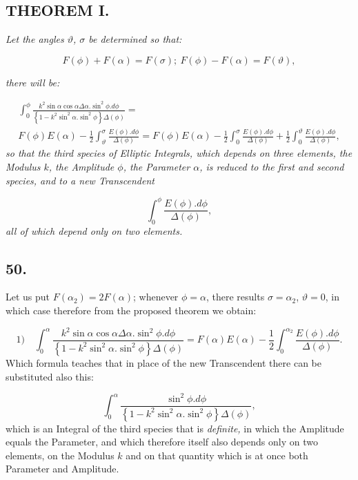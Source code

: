 \documentclass{article}
\begin{document}
\subsection*{THEOREM I.}

\emph{Let the angles $\vartheta$, $\sigma$ be determined so that:}

\[
F(\phi)+F(\alpha)=F(\sigma);\ F(\phi)-F(\alpha)=F(\vartheta),
\]

\emph{there will be:}

\[
\begin{gathered}
\int_{0}^{\phi}\frac{k^{2}\sin\alpha\cos\alpha\Delta\alpha.\sin^{2}\phi.d\phi}{\left\{1-k^{2}\sin^{2}\alpha.\sin^{2}\phi\right\}\Delta(\phi)}=\\[1.5ex]
F(\phi)E(\alpha)-\frac{1}{2}\int_{\vartheta}^{\sigma}\frac{E(\phi).d\phi}{\Delta(\phi)}=F(\phi)E(\alpha)-\frac{1}{2}\int_{0}^{\sigma}\frac{E(\phi).d\phi}{\Delta(\phi)}+\frac{1}{2}\int_{0}^{\vartheta}\frac{E(\phi).d\phi}{\Delta(\phi)},
\end{gathered}
\]
\emph{so that the third species of Elliptic Integrals, which depends on three elements, the Modulus $k$, the Amplitude $\phi$, the Parameter $\alpha$, is reduced to the first and second species, and to a new Transcendent}

\[
\int_{0}^{\phi}\frac{E(\phi).d\phi}{\Delta(\phi)},
\]
\emph{all of which depend only on two elements.}

\subsection*{50.}

Let us put $F(\alpha_{2})=2F(\alpha)$; whenever $\phi=\alpha$, there results $\sigma=\alpha_{2}$, $\vartheta=0$, in which case therefore from the proposed theorem we obtain:

\[
\text{1)}\quad\int_{0}^{\alpha}\frac{k^{2}\sin\alpha\cos\alpha\Delta\alpha.\sin^{2}\phi.d\phi}{\left\{1-k^{2}\sin^{2}\alpha.\sin^{2}\phi\right\}\Delta(\phi)}=F(\alpha)E(\alpha)-\frac{1}{2}\int_{0}^{\alpha_{2}}\frac{E(\phi).d\phi}{\Delta(\phi)}.
\]
Which formula teaches that in place of the new Transcendent there can be substituted also this:

\[
\int_{0}^{\alpha}\frac{\sin^{2}\phi.d\phi}{\left\{1-k^{2}\sin^{2}\alpha.\sin^{2}\phi\right\}\Delta(\phi)},
\]
which is an Integral of the third species that is \emph{definite,} in which the Amplitude equals the Parameter, and which therefore itself also depends only on two elements, on the Modulus $k$ and on that quantity which is at once both Parameter and Amplitude.
\end{document}
